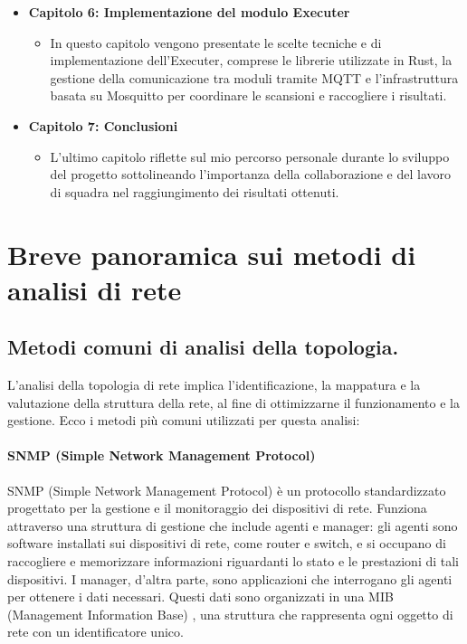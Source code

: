 \documentclass[target=bach,aauheader=,style=]{thud}
\begin{document}
\begin{itemize}
  \item \textbf{Capitolo 6: Implementazione del modulo Executer}
    \begin{itemize}
      \item[] In questo capitolo vengono presentate le scelte tecniche e di implementazione dell'Executer, comprese le librerie utilizzate in Rust, la gestione della comunicazione tra moduli tramite MQTT e l'infrastruttura basata su Mosquitto per coordinare le scansioni e raccogliere i risultati.
    \end{itemize}

  \item \textbf{Capitolo 7: Conclusioni}
    \begin{itemize}
      \item[] L'ultimo capitolo riflette sul mio percorso personale durante lo sviluppo del progetto sottolineando l'importanza della collaborazione e del lavoro di squadra nel raggiungimento dei risultati ottenuti. 
    \end{itemize}

\end{itemize}


\chapter{Breve panoramica sui metodi di analisi di rete}
\label{art}
\section{Metodi comuni di analisi della topologia.}
L'analisi della topologia di rete implica l'identificazione, la mappatura e la valutazione della struttura della rete, al fine di ottimizzarne il funzionamento e la gestione. Ecco i metodi più comuni utilizzati per questa analisi:
\subsubsection{SNMP (Simple Network Management Protocol)} 
SNMP (Simple Network Management Protocol) \cite{rfc1157} è un protocollo standardizzato progettato per la gestione e il monitoraggio dei dispositivi di rete. Funziona attraverso una struttura di gestione che include agenti e manager: gli agenti sono software installati sui dispositivi di rete, come router e switch, e si occupano di raccogliere e memorizzare informazioni riguardanti lo stato e le prestazioni di tali dispositivi. I manager, d'altra parte, sono applicazioni che interrogano gli agenti per ottenere i dati necessari. Questi dati sono organizzati in una MIB (Management Information Base) \cite{rfc1213}, una struttura che rappresenta ogni oggetto di rete con un identificatore unico.
\end{document}
